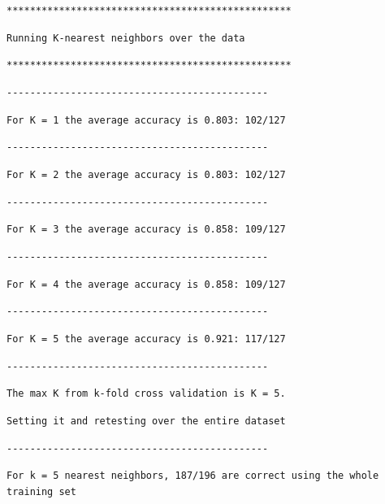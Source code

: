 \documentclass[listings, listings-bw, listings-color, listings-sv]{article}
\begin{document}
\verb~*************************************************~

\verb~Running K-nearest neighbors over the data~

\verb~*************************************************~

\verb~---------------------------------------------~

\verb~For K = 1 the average accuracy is 0.803: 102/127~

\verb~---------------------------------------------~

\verb~For K = 2 the average accuracy is 0.803: 102/127~

\verb~---------------------------------------------~

\verb~For K = 3 the average accuracy is 0.858: 109/127~

\verb~---------------------------------------------~

\verb~For K = 4 the average accuracy is 0.858: 109/127~

\verb~---------------------------------------------~

\verb~For K = 5 the average accuracy is 0.921: 117/127~

\verb~---------------------------------------------~

\verb~The max K from k-fold cross validation is K = 5.~

\verb~Setting it and retesting over the entire dataset~

\verb~---------------------------------------------~

\verb~For k = 5 nearest neighbors, 187/196 are correct using the whole training set~
\end{document}
